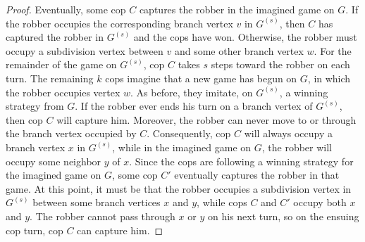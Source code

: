 \documentclass[10pt,a4paper]{amsart}
\begin{document}
\begin{proof}
    Eventually, some cop $C$ captures the robber in the imagined game on $G$. If the robber occupies the corresponding branch vertex $v$ in $G^{(s)}$, then $C$ has captured the robber in $G^{(s)}$ and the cops have won.  Otherwise, the robber must occupy a subdivision vertex between $v$ and some other branch vertex $w$.  For the remainder of the game on $G^{(s)}$, cop $C$ takes $s$ steps toward the robber on each turn.  The remaining $k$ cops imagine that a new game has begun on $G$, in which the robber occupies vertex $w$.  As before, they imitate, on $G^{(s)}$, a winning strategy from $G$.  If the robber ever ends his turn on a branch vertex of $G^{(s)}$, then cop $C$ will capture him.  Moreover, the robber can never move to or through the branch vertex occupied by $C$.  Consequently, cop $C$ will always occupy a branch vertex $x$ in $G^{(s)}$, while in the imagined game on $G$, the robber will occupy some neighbor $y$ of $x$.  Since the cops are following a winning strategy for the imagined game on  $G$, some cop $C'$ eventually captures the robber in that game.  At this point, it must be that the robber occupies a subdivision vertex in $G^{(s)}$ between some branch vertices $x$ and $y$, while cops $C$ and $C'$ occupy both $x$ and $y$.  The robber cannot pass through $x$ or $y$ on his next turn, so on the ensuing cop turn, cop $C$ can capture him.
\end{proof}
\end{document}
